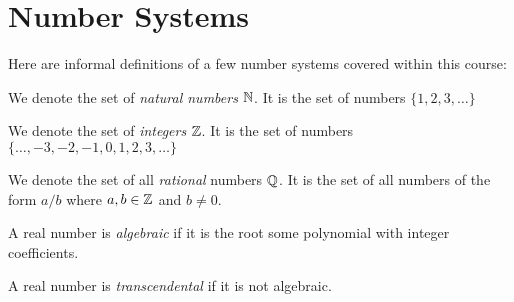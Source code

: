 \documentclass[../main.tex]{subfiles}
\begin{document}
\section{Number Systems}
Here are informal definitions of a few number systems covered within this course:
\begin{definition}
  We denote the set of \textit{natural numbers} $\mathbb{N}$. It is the set of numbers $\{1, 2, 3, \ldots\}$
\end{definition}
\begin{definition}[Integers]
  We denote the set of \textit{integers} $\mathbb{Z}$. It is the set of numbers $\{\ldots, -3, -2, -1 , 0, 1, 2, 3, \ldots\}$
\end{definition}
\begin{definition}
  We denote the set of all \textit{rational} numbers $\mathbb{Q}$. It is the set of all numbers of the form $a/b$ where $a, b \in \mathbb{Z}$ and $b \neq 0$.
\end{definition}
\begin{definition}
  A real number is \textit{algebraic} if it is the root some polynomial with integer coefficients.
\end{definition}
\begin{definition}
  A real number is \textit{transcendental} if it is not algebraic. 
\end{definition}
\end{document}
